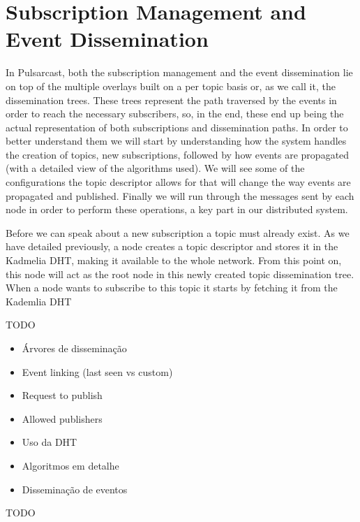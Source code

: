 \section{Subscription Management and Event Dissemination}\label{subscription-management-event-dissemination}

In Pulsarcast, both the subscription management and the event dissemination lie
on top of the multiple overlays built on a per topic basis or, as we call it,
the dissemination trees. These trees represent the path traversed by the events
in order to reach the necessary subscribers, so, in the end, these end up being
the actual representation of both subscriptions and dissemination paths. In
order to better understand them we will start by understanding how the system
handles the creation of topics, new subscriptions, followed by how events are
propagated (with a detailed view of the algorithms used). We will see some of
the configurations the topic descriptor allows for that will change the way
events are propagated and published. Finally we will run through the messages
sent by each node in order to perform these operations, a key part in our
distributed system.

Before we can speak about a new subscription a topic must already exist. As we have detailed previously, a node creates a topic descriptor and stores it in the Kadmelia DHT, making it available to the whole network. From this point on, this node will act as the root node in this newly created topic dissemination tree. When a node wants to subscribe to this topic it starts by fetching it from the Kademlia DHT

TODO
\begin{itemize}
\item Árvores de disseminação
\item Event linking (last seen vs custom)
\item Request to publish
\item Allowed publishers
\item Uso da DHT
\item Algoritmos em detalhe
\item Disseminação de eventos
\end{itemize}

TODO

